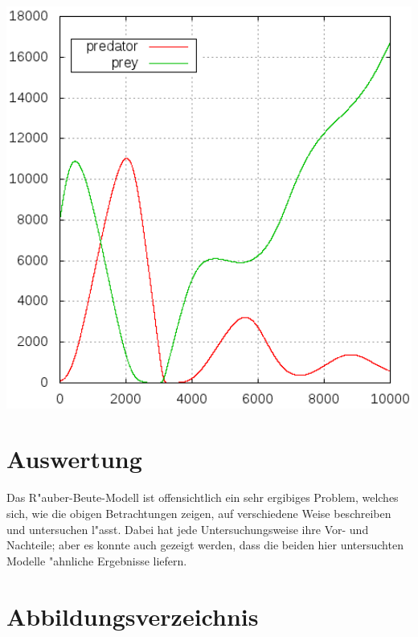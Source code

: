 \documentclass[11pt]{article}
\begin{document}
\begin{minipage}[b]{0.6\textwidth}
\includegraphics[width=1.0\textwidth]{Graphiken/ppm226pop.png}
\end{minipage}

\section{Auswertung}
Das R"auber-Beute-Modell ist offensichtlich ein sehr ergibiges Problem, welches sich, wie die obigen Betrachtungen zeigen, auf verschiedene Weise beschreiben und untersuchen l"asst. Dabei hat jede Untersuchungsweise ihre Vor- und Nachteile; aber es konnte auch gezeigt werden, dass die beiden hier untersuchten Modelle "ahnliche Ergebnisse liefern.

\section{Abbildungsverzeichnis}
\end{document}
